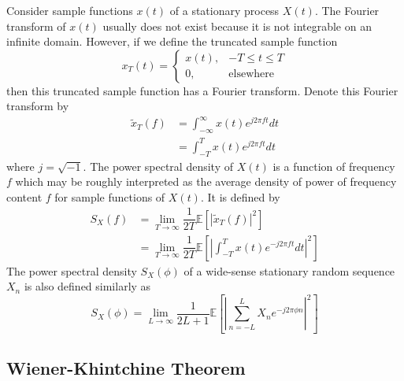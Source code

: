 \documentclass[11pt]{report} %
\begin{document}
Consider sample functions $x\left(t\right)$ of a stationary process $X\left(t\right)$. The Fourier transform of $x\left(t\right)$ usually does not exist because it is not integrable on an infinite domain. However, if we define the truncated sample function
\begin{equation}
x_{T}\left(t\right) = \begin{cases} x\left(t\right), & -T\leq t\leq T \\ 0, & \mathrm{elsewhere}\end{cases}
\end{equation}
then this truncated sample function has a Fourier transform. Denote this Fourier transform by
\begin{align}
\widetilde{x}_{T}\left(f\right) &= \int_{-\infty}^{\infty}x\left(t\right)e^{j2\pi ft}dt \\
&= \int_{-T}^{T}x\left(t\right)e^{j2\pi ft}dt
\end{align}
where $j = \sqrt{-1}$. The power spectral density of $X\left(t\right)$ is a function of frequency $f$ which may be roughly interpreted as the average density of power of frequency content $f$ for sample functions of $X\left(t\right)$. It is defined by
\begin{align}
S_{X}\left(f\right) &= \lim_{T\to\infty}\dfrac{1}{2T}\mathbb{E}\left[\left|\widetilde{x}_{T}\left(f\right)\right|^{2}\right] \\
&= \lim_{T\to\infty}\dfrac{1}{2T}\mathbb{E}\left[\left|\int_{-T}^{T}x\left(t\right)e^{-j2\pi ft}dt\right|^{2}\right]
\end{align}
The power spectral density $S_{X}\left(\phi\right)$ of a wide-sense stationary random sequence $X_{n}$ is also defined similarly as
\begin{equation}
S_{X}\left(\phi\right) = \lim_{L\to\infty}\dfrac{1}{2L + 1}\mathbb{E}\left[\left|\sum_{n = -L}^{L}X_{n}e^{-j2\pi\phi n}\right|^{2}\right]
\end{equation}

\subsection{Wiener-Khintchine Theorem \cite{Yates2005}}
\end{document}

